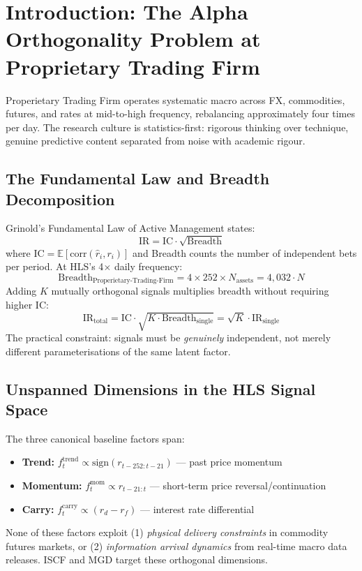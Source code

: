 \documentclass[12pt,a4paper]{article}
\begin{document}
\newpage\tableofcontents\newpage

\section{Introduction: The Alpha Orthogonality Problem at Proprietary Trading Firm }
\label{sec:intro}

Properietary Trading Firm operates systematic macro across FX, commodities, futures, and rates at mid-to-high frequency, rebalancing approximately four times per day. The research culture is statistics-first: rigorous thinking over technique, genuine predictive content separated from noise with academic rigour.

\subsection{The Fundamental Law and Breadth Decomposition}

Grinold's \citeyearpar{grinold1989} Fundamental Law of Active Management states:
\begin{equation}
  \text{IR} = \text{IC} \cdot \sqrt{\text{Breadth}}
  \label{eq:floam}
\end{equation}
where $\text{IC} = \mathbb{E}[\text{corr}(\hat{r}_i, r_i)]$ and Breadth counts the number of independent bets per period. At HLS's 4$\times$ daily frequency:
\begin{equation}
  \text{Breadth}_{\text{Properietary-Trading-Firm}} = 4 \times 252 \times N_{\text{assets}} = 4,032 \cdot N
  \label{eq:breadth}
\end{equation}
Adding $K$ mutually orthogonal signals multiplies breadth without requiring higher IC:
\begin{equation}
  \text{IR}_{\text{total}} = \text{IC} \cdot \sqrt{K \cdot \text{Breadth}_{\text{single}}}
  = \sqrt{K} \cdot \text{IR}_{\text{single}}
  \label{eq:ir_scaling}
\end{equation}
The practical constraint: signals must be \emph{genuinely} independent, not merely different parameterisations of the same latent factor.

\subsection{Unspanned Dimensions in the HLS Signal Space}

The three canonical baseline factors span:
\begin{itemize}
  \item \textbf{Trend:} $f_t^{\text{trend}} \propto \text{sign}(r_{t-252:t-21})$ — past price momentum
  \item \textbf{Momentum:} $f_t^{\text{mom}} \propto r_{t-21:t}$ — short-term price reversal/continuation
  \item \textbf{Carry:} $f_t^{\text{carry}} \propto (r_d - r_f)$ — interest rate differential
\end{itemize}
None of these factors exploit (1) \emph{physical delivery constraints} in commodity futures markets, or (2) \emph{information arrival dynamics} from real-time macro data releases. ISCF and MGD target these orthogonal dimensions.
\end{document}
